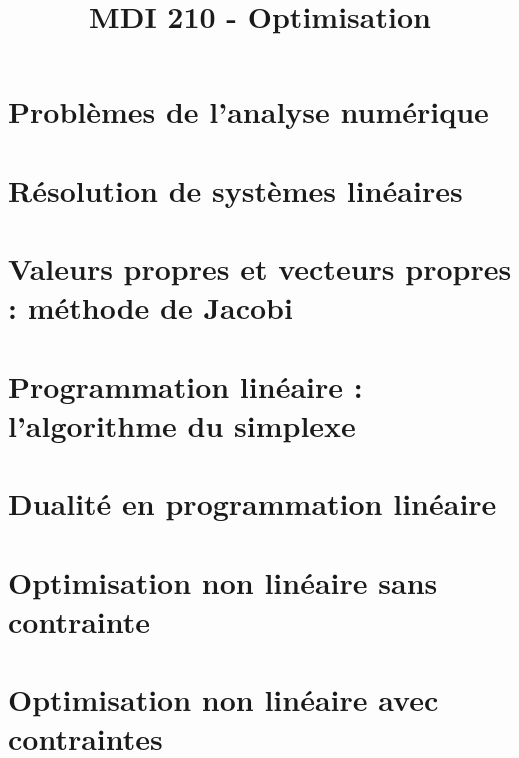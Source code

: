 \documentclass[a4paper,11pt]{article}
\title{\vspace{-1.2cm} \textbf{MDI 210 - Optimisation}}
\begin{document}
\maketitle

\vspace{-1.5cm}

\section{Problèmes de l'analyse numérique}

	

\section{Résolution de systèmes linéaires}

	

\section{Valeurs propres et vecteurs propres : méthode de Jacobi}

	

\section{Programmation linéaire : l'algorithme du simplexe}

	

\section{Dualité en programmation linéaire}

	

\section{Optimisation non linéaire sans contrainte}

	

\section{Optimisation non linéaire avec contraintes}

	
\end{document}
